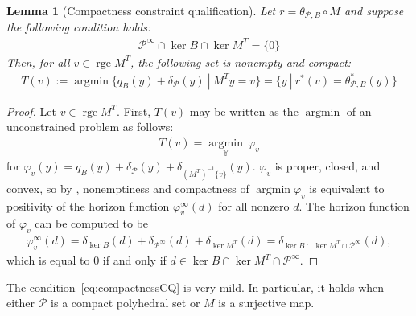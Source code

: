 \documentclass[reqno]{amsart}
\newtheorem{theorem}[proposition]{Theorem}
\newtheorem{lemma}[proposition]{Lemma}
\numberwithin{equation}{section}
\newcommand{\pol}{\mathcal{P}}
\newcommand{\tpb}{\theta_{\mathcal{P},B}}
\newcommand{\np}{N_{\mathcal{P}}}
\newcommand{\x}{\bar{x}}
\newcommand{\argmin}{\operatorname{argmin}}
\newcommand{\gph}{\operatorname{gph}}
\newcommand{\para}{\mathrm{par}\,}
\newcommand{\rge}{\operatorname{rge}}
\begin{document}

\begin{lemma}[Compactness constraint qualification] \label{CCQ}
    Let $r = \tpb \circ M$ and suppose the following condition holds:
    \begin{align}\label{eq:compactnessCQ}
        \mathcal{P}^{\infty} \cap \ker B \cap \ker M^T = \{0\}
    \end{align} Then, for all $\bar{v} \in \rge M^T$, the following set is
    nonempty and compact:
    \begin{align}\label{eq:Tv}
        T(v) := \argmin \{q_B(y) + \delta_{\pol}(y) \ | \ M^Ty = v\} = \{y \ | \ r^*(v) = \tpb^*(y)\}
    \end{align}
\end{lemma}

\begin{proof}
    Let $v \in \rge M^T$. First, $T(v)$ may be written as the $\argmin$ of an unconstrained problem as follows:\begin{align*}
        T(v) = \underset{\mathbb{Y}}{\argmin} \, \varphi_v
    \end{align*} for $\varphi_v(y) = q_B(y) + \delta_{\pol}(y) + \delta_{(M^T)^{-1}\{v\}}(y)$.
    $\varphi_v$ is proper, closed, and convex, so by \cite[Proposition 3.1.3]{AT 03}, 
    nonemptiness and compactness of $\argmin \varphi_v$ is equivalent to positivity of the horizon function $\varphi_v^{\infty}(d)$ for all nonzero $d$.
    The horizon function of $\varphi_v$ can be computed to be \begin{align*}
        \varphi_v^{\infty}(d) = \delta_{\ker B}(d) + \delta_{\pol^{\infty}}(d) + \delta_{\ker M^T}(d)
        = \delta_{\ker B \cap \ker M^T \cap \pol^{\infty}} (d),
    \end{align*} which is equal to $0$ if and only if $d \in \ker B \cap \ker M^T \cap \pol^{\infty}$.
\end{proof}

The condition~\eqref{eq:compactnessCQ} is very mild. In particular, it holds when either $\mathcal{P}$ is a compact polyhedral set or $M$ is a surjective map.   

\end{document}
